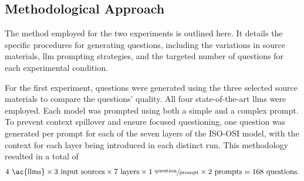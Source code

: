 \subsection{Methodological Approach}
\label{sec:methodological-approach}

The method employed for the two experiments is outlined here. It details the specific procedures for generating questions, including the variations in source materials, \ac{llm} prompting strategies, and the targeted number of questions for each experimental condition.


 For the first experiment, questions were generated using the three selected source materials to compare the questions' quality. All four state-of-the-art \ac{llms} were employed. Each model was prompted using both a simple and a complex prompt. To prevent context spillover and ensure focused questioning, one question was generated per prompt for each of the seven layers of the ISO-OSI model, with the context for each layer being introduced in each distinct run. This methodology resulted in a total of \begin{align}4 \text{ \ac{llms}} \times 3 \text{ input sources} \times 7 \text{ layers} \times 1 \sfrac{\text{ question}}{\text{prompt}} \times 2 \text{ prompts} = 168 \text{ questions.}\end{align}


